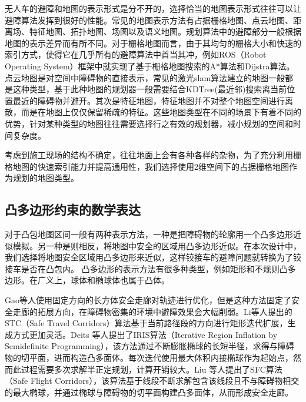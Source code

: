 \documentclass[master,academic]{ysuthesis} %
\begin{document}
	无人车的避障和地图的表示形式是分不开的，选择恰当的地图表示形式往往可以让避障算法发挥到很好的性能。常见的地图表示方法有占据栅格地图、点云地图、距离场、特征地图、拓扑地图、场图以及语义地图。规划算法中的避障部分一般根据地图的表示差异而有所不同。对于栅格地图而言，由于其均匀的栅格大小和快速的索引方式，使得它在几乎所有的避障算法中首当其冲，例如ROS（Robot Operating System）框架中就实现了基于栅格地图搜索的A*算法和Dijstra算法\cite{koubaa2017robot}。点云地图是对空间中障碍物的直接表示，常见的激光slam算法建立的地图一般都是这种类型，基于此种地图的规划器一般需要结合KDTree(最近邻)搜索离当前位置最近的障碍物并避开。其次是特征地图，特征地图并不对整个地图空间进行离散，而是在地图上仅仅保留稀疏的特征。这些地图类型在不同的场景下有着不同的优势，针对某种类型的地图往往需要选择行之有效的规划器，减小规划的空间和时间复杂度。
	
	考虑到施工现场的结构不确定，往往地面上会有各种各样的杂物，为了充分利用栅格地图的快速索引能力并提高通用性，我们选择使用2维空间下的占据栅格地图作为规划的地图类型。
		\subsection{凸多边形约束的数学表达}
		对于凸包地图区间一般有两种表示方法，一种是把障碍物的轮廓用一个凸多边形近似模拟。另一种是则相反，将地图中安全的区域用凸多边形近似。在本次设计中，我们选择将地图安全区域用凸多边形来近似，这样铰接车的避障问题就转换为了铰接车是否在凸包内。
		凸多边形的表示方法有很多种类型，例如矩形和不规则凸多边形。在广义上，球体和椭球体也属于凸体。
		
		Gao等人\cite{Gao2018OnlineST}使用固定方向的长方体安全走廊对轨迹进行优化，但是这种方法固定了安全走廊的拓展方向，在障碍物密集的环境中避障效果会大幅削弱。Li\cite{BaiLi:2022}等人提出的STC（Safe Travel Corridors）算法基于当前路径段的方向进行矩形迭代扩展，生成方式更加灵活。Deits 等人\cite{Deits:2015}提出了IRIS算法（Iterative Region Inflation by Semidefinite Programming），该方法通过不断膨胀椭球的长短半径，求得与障碍物的切平面，进而构造凸多面体。每次迭代使用最大体积内接椭球作为起始点，然而此过程需要多次求解半正定规划，计算开销较大。Liu 等人\cite{SikangLiu:2017}提出了SFC算法（Safe Flight Corridors），该算法基于线段不断求解包含该线段且不与障碍物相交的最大椭球，并通过椭球与障碍物的切平面构建凸多面体，从而形成安全走廊。
		
\end{document}

